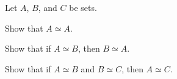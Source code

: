 \begin{pa} \label{pa:countability} Let $A$, $B$, and $C$ be sets. 
\be
\item Show that $A \simeq A$.

\item Show that if $A \simeq B$, then $B \simeq A$.

\item Show that if $A \simeq B$ and $B \simeq C$, then $A \simeq C$. 

\ee

\end{pa}

\begin{comment}

\ActivitySolution

\be
\item The function $id : A \to A$ defined by $id(a) = a$ for all $a \in A$ is clearly a bijection, so $A \simeq A$ and $\simeq$ is a reflexive relation.

\item Assume that $A \simeq B$. Then there is a bijection $f : A \to B$. To show that $B \simeq A$, we need to find a bijection from $B$ to $A$. Define $g : B \to A$ by 
\[g(b) = a \text{ when } f(a) = b.\]
First we show that $g$ is actually a function. If $b \in B$ so that $g(b) = a_1$ and $g(b) = a_2$, then $b = f(a_1) = f(a_2)$. Since $f$ is an injection, we know $a_1=a_2$. Thus, $g$ assigns exactly one output for each input and $g$ is a function. Next we show that $g$ is an injection. Suppose $b_1, b_2 \in B$ with $g(b_1) = g(b_2)$. Since $f$ is a surjection, there exist $a_1, a_2 \in A$ with $f(a_1) = b_1$ and $f(a_2) = b_2$. So 
\[a_1 = g(b_1) = g(b_2) = a_2\]
and since $f$ is a function we know $a_1=a_2$ implies $f(a_1)=f)a_2)$. Thus, $b_1 = f(a_1) = f(a_2) = b_2$ and $g$ is an injection. 
To complete our proof that $g$ is a bijection, we show that $g$ is a surjection. Let $a \in A$. Then $f(a) \in B$. Let $b = f(a)$. By definition, $g(b)=a$ and $g$ is a  surjection. Therefore, $g : B \to A$ is a bijection and $B \simeq A$. Thus, the relation $\simeq$ is a symmetric relation.

\item Assume that $A \simeq B$ and $B \simeq C$. Then we can find bijections $f : A \to B$ and $g : B \to C$. We need to show that there is a bijection from $A$ to $C$. The natural candidate is the composite $g \circ f$. To show that $g \circ f$ is an injection, suppose $a_1, a_2 \in A$ with $(g \circ f)(a_1) = (g \circ f)(a_2)$. Then $g(f(a_1)) = g(f(a_2))$. Since $g$ is an injection, we know $f(a_1) = f(a_2)$. Since $f$ is an injection, we can conclude $a_1=a_2$. Therefore, $g \circ f$ is an injection. To show $g \circ f$ is a surjection, choose an arbitrary $c \in C$. Since $g$ is a surjection, there is a $b \in B$ so that $g(b) = c$. Since $f$ is a surjection, there is an $a \in A$ so that $f(a)=b$. Then $(g \circ f)(a) = g(f(a)) = g(b) = c$ and $g \circ f$ is a surjection. Thus, $g \circ f : A \to C$ is a bijection and $A \simeq C$. 

\ee

\end{comment}



